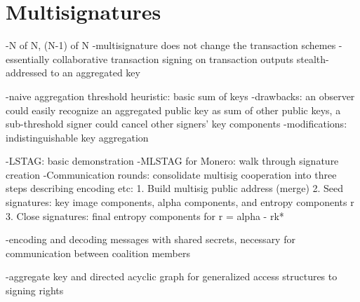 \chapter{Multisignatures}
\label{chapter:multisignatures}

-N of N, (N-1) of N
-multisignature does not change the transaction schemes
-essentially collaborative transaction signing on transaction outputs stealth-addressed to an aggregated key


-naive aggregation threshold heuristic: basic sum of keys
    -drawbacks: an observer could easily recognize an aggregated public key as sum of other public keys, a sub-threshold signer could cancel other signers' key components
    -modifications: indistinguishable key aggregation

-LSTAG: basic demonstration
-MLSTAG for Monero: walk through signature creation
-Communication rounds: consolidate multisig cooperation into three steps describing encoding etc:
    1. Build multisig public address (merge)
    2. Seed signatures: key image components, alpha components, and entropy components r
    3. Close signatures: final entropy components for r = alpha - rk*
    
-encoding and decoding messages with shared secrets, necessary for communication between coalition members

-aggregate key and directed acyclic graph for generalized access structures to signing rights
